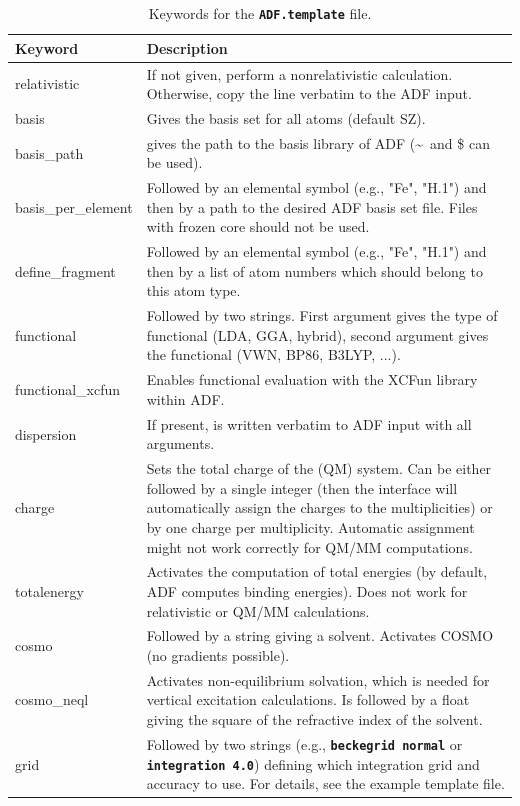 \documentclass[a4paper,10pt,DIV=15,openany]{scrbook}
\newcommand{\ttt}[1]{\textbf{\texttt{#1}}}
\begin{document}
\begin{table}
  \centering
  \caption{Keywords for the \ttt{ADF.template} file.}
  \label{tab:adf_temp}
  \small
  \begin{tabular}{>{\ttfamily}lp{12cm}}
  \hline
  Keyword       &Description\\
  \hline
relativistic            &If not given, perform a nonrelativistic calculation. Otherwise, copy the line verbatim to the ADF input.
\\
basis                   &Gives the basis set for all atoms (default SZ).
\\
basis\_path             &gives the path to the basis library of ADF (\textasciitilde\ and \$ can be used).
\\
basis\_per\_element     &Followed by an elemental symbol (e.g., "Fe", "H.1") and then by a path to the desired ADF basis set file. Files with frozen core should not be used.
\\
define\_fragment        &Followed by an elemental symbol (e.g., "Fe", "H.1") and then by a list of atom numbers which should belong to this atom type.
\\
functional              &Followed by two strings. First argument gives the type of functional (LDA, GGA, hybrid), second argument gives the functional (VWN, BP86, B3LYP, ...).
\\
functional\_xcfun       &Enables functional evaluation with the XCFun library within ADF.
\\
dispersion              &If present, is written verbatim to ADF input with all arguments.
\\
charge                  &Sets the total charge of the (QM) system. Can be either followed by a single integer (then the interface will automatically assign the charges to the multiplicities) or by one charge per multiplicity. Automatic assignment might not work correctly for QM/MM computations.
\\
totalenergy             &Activates the computation of total energies (by default, ADF computes binding energies). Does not work for relativistic or QM/MM calculations.
\\
cosmo                   &Followed by a string giving a solvent. Activates COSMO (no gradients possible).
\\
cosmo\_neql             &Activates non-equilibrium solvation, which is needed for vertical excitation calculations. Is followed by a float giving the square of the refractive index of the solvent.
\\
grid                    &Followed by two strings (e.g., \ttt{beckegrid normal} or \ttt{integration 4.0}) defining which integration grid and accuracy to use. For details, see the example template file.

\end{tabular}
\end{table}
\end{document}
